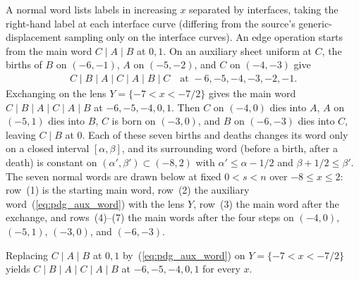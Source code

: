 \begin{definition}
    \label{def:peps_dyadic_normal_words}
    \leanok
    A normal word lists labels in increasing $x$ separated by interfaces, taking
    the right-hand label at each interface curve (differing from the source's
    generic-displacement sampling only on the interface curves). An edge operation
    starts from the main word $C\mid A\mid B$ at $0,1$. On an auxiliary sheet
    uniform at $C$, the births of $B$ on $(-6,-1)$, $A$ on $(-5,-2)$, and $C$ on
    $(-4,-3)$ give
    \begin{align}
        C\mid B\mid A\mid C\mid A\mid B\mid C\quad\text{at } -6,-5,-4,-3,-2,-1.
        \label{eq:pdg_aux_word}
    \end{align}
    Exchanging on the lens $Y=\{-7<x<-7/2\}$ gives the main word
    $C\mid B\mid A\mid C\mid A\mid B$ at $-6,-5,-4,0,1$. Then $C$ on $(-4,0)$
    dies into $A$, $A$ on $(-5,1)$ dies into $B$, $C$ is born on $(-3,0)$, and
    $B$ on $(-6,-3)$ dies into $C$, leaving $C\mid B$ at $0$. Each of these seven
    births and deaths changes its word only on a closed interval
    $[\alpha,\beta]$, and its surrounding word (before a birth, after a death) is
    constant on $(\alpha',\beta')\subset(-8,2)$ with
    $\alpha'\le\alpha-1/2$ and $\beta+1/2\le\beta'$. The seven normal words are
    drawn below at fixed $0<s<n$ over $-8\le x\le2$: row~(1) is the starting main
    word, row~(2) the auxiliary word~(\ref{eq:pdg_aux_word}) with the lens $Y$,
    row~(3) the main word after the exchange, and rows~(4)--(7) the main words
    after the four steps on $(-4,0)$, $(-5,1)$, $(-3,0)$, and $(-6,-3)$.
    
\end{definition}

\begin{lemma}
    \label{lem:peps_dyadic_lens_word}
    \leanok
    Replacing $C\mid A\mid B$ at $0,1$ by~(\ref{eq:pdg_aux_word}) on
    $Y=\{-7<x<-7/2\}$ yields $C\mid B\mid A\mid C\mid A\mid B$ at
    $-6,-5,-4,0,1$ for every $x$.
\end{lemma}

